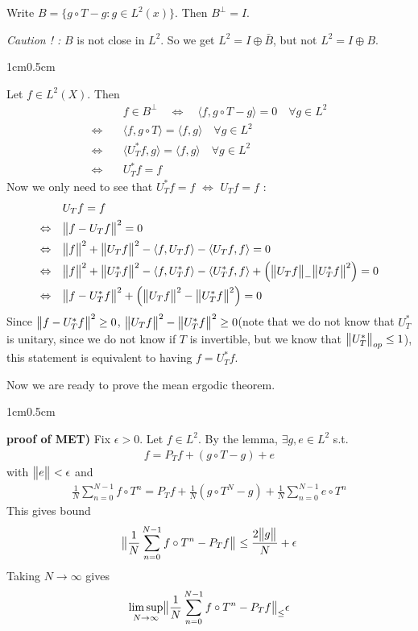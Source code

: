 \documentclass[12pt,a4paper]{report}
\newenvironment{proof}
{\begin{changemargin}{1cm}{0.5cm} 
	}%
	{\end{changemargin}
}
\begin{document}
\lem Write $B = \{g\circ T-g:g\in L^2(x) \}$. Then $B^{\perp} =I$.
\s

\textit{Caution ! :} $B$ is not close in $L^2$. So we get $L^2 = I \oplus \bar{B}$, but not $L^2 = I \oplus B$. 

\begin{proof}
\pf Let $f\in L^2(X)$. Then
\begin{align*}
& f\in B^{\perp} \quad \Leftrightarrow \quad \langle f, g\circ T - g\rangle = 0 \quad \forall g \in L^2 \\
\Leftrightarrow \quad & \langle f, g\circ T \rangle = \langle f, g\rangle \quad \forall g \in L^2 \\
\Leftrightarrow \quad & \langle U^*_T f, g\rangle = \langle f, g\rangle \quad \forall g \in L^2 \\
\Leftrightarrow \quad & U^*_T f = f
\end{align*}
Now we only need to see that $U^*_T f=f$ $\Leftrightarrow$ $U_T f =f$ :
\begin{align*}
& U_T f = f \\
\Leftrightarrow \quad &\bigl\lVert f-U_T f\bigr\rVert_{}^2 = 0 \\
\Leftrightarrow \quad & \bigl\lVert f\bigr\rVert_{}^2 + \bigl\lVert U_T f\bigr\rVert_{}^2 - \langle f, U_T f\rangle - \langle U_T f,f\rangle =0 \\
\Leftrightarrow \quad & \bigl\lVert f\bigr\rVert_{}^2 + \bigl\lVert U^{*}_T f\bigr\rVert_{}^2 - \langle f, U^{*}_T f\rangle - \langle U^{*}_T f, f\rangle + \Big( \bigl\lVert U_T f\bigr\rVert_{-} \bigl\lVert U^*_T f\bigr\rVert_{}^2 \Big) =0 \\
\Leftrightarrow \quad & \bigl\lVert f-U^{*}_T f\bigr\rVert_{}^2 + \Big( \bigl\lVert U_T f\bigr\rVert_{}^2 - \bigl\lVert U^{*}_T f\bigr\rVert_{}^2 \Big) = 0
\end{align*}
Since $\bigl\lVert f-U^*_T f\bigr\rVert_{}^2 \geq 0$, $\bigl\lVert U_T f\bigr\rVert_{}^2 - \bigl\lVert U^*_T f\bigr\rVert_{}^2 \geq 0$(note that we do not know that $U^*_T$ is unitary, since we do not know if $T$ is invertible, but we know that $\bigl\lVert U^*_T\bigr\rVert_{op} \leq 1$), this statement is equivalent to having $f = U^*_T f$.
\end{proof}
\s

Now we are ready to prove the mean ergodic theorem.

\begin{proof}
\textbf{proof of MET) } Fix $\epsilon>0$. Let $f\in L^2$. By the lemma, $\exists g,e \in L^2$ s.t.
\begin{align*}
f= P_T f + (g\circ T -g) +e
\end{align*}
with $\bigl\lVert e\bigr\rVert_{} <\epsilon$ and
\begin{align*}
\frac{1}{N}\sum_{n=0}^{N-1}f\circ T^n = P_T f + \frac{1}{N}(g\circ T^N -g) + \frac{1}{N} \sum_{n=0}^{N-1} e\circ T^n
\end{align*}
This gives bound
\begin{align*}
\bigl\lVert\frac{1}{N}\sum_{n=0}^{N-1}f\circ T^n - P_T f\bigr\rVert_{} \leq \frac{2\bigl\lVert g\bigr\rVert_{}}{N} + \epsilon
\end{align*}
Taking $N\rightarrow \infty$ gives
\begin{align*}
\limsup_{N\rightarrow \infty} \bigl\lVert\frac{1}{N} \sum_{n=0}^{N-1} f\circ T^n - P_T f\bigr\rVert_{\leq} \epsilon
\end{align*}

\eop
\end{proof}
\s
\end{document}
